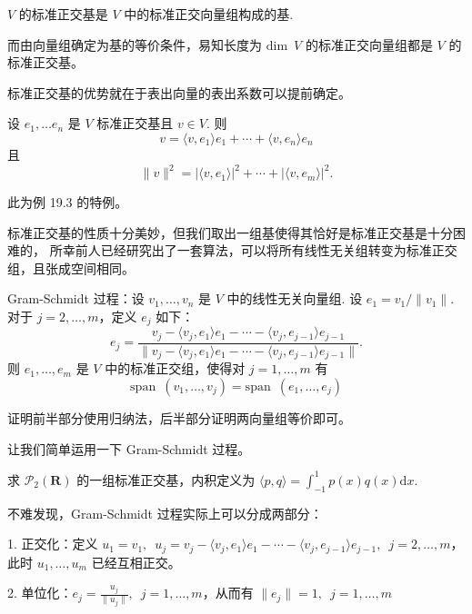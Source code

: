 \begin{definition}
    $ V $ 的标准正交基是 $ V $ 中的标准正交向量组构成的基.
\end{definition}

而由向量组确定为基的等价条件，易知长度为 $\mathrm{dim} \enspace V$ 的标准正交向量组都是
$ V $ 的标准正交基。    

标准正交基的优势就在于表出向量的表出系数可以提前确定。

\begin{theorem}
    设 $e_1, \ldots e_n$ 是 $ V $ 标准正交基且 $ v \in V$. 则
    \[ v = \langle v, e_1 \rangle e_1 + \cdots + \langle v, e_n \rangle e_n \]
    且
    \[ \lVert v \rVert^2 = \lvert \langle v, e_1\rangle \rvert^2 + \cdots + \lvert \langle v, e_m\rangle \rvert^2. \]
\end{theorem}

此为例 19.3 的特例。


标准正交基的性质十分美妙，但我们取出一组基使得其恰好是标准正交基是十分困难的，
所幸前人已经研究出了一套算法，可以将所有线性无关组转变为标准正交组，且张成空间相同。

\begin{theorem}
    Gram-Schmidt 过程：设 $v_1, \ldots ,v_n$ 是 $ V $ 中的线性无关向量组.
    设 $e_1 = v_1/ \lVert v_1 \rVert$. 对于 $ j = 2, \ldots , m$，定义 $ e_j $ 如下：
    \[ e_j = \frac{v_j - \langle v_j, e_1 \rangle e_1 - \cdots - \langle v_j, e_{j - 1} \rangle e_{j - 1} }{\lVert v_j - \langle v_j, e_1 \rangle e_1 - \cdots - \langle v_j, e_{j - 1} \rangle e_{j - 1} \rVert}.\]
    则 $e_1, \ldots , e_m $ 是 $ V $ 中的标准正交组，使得对 $ j = 1, \ldots , m $ 有
    \[ \mathrm{span} \enspace (v_1, \ldots, v_j) = \mathrm{span} \enspace (e_1, \ldots, e_j) \]
\end{theorem}

证明前半部分使用归纳法，后半部分证明两向量组等价即可。

让我们简单运用一下 Gram-Schmidt 过程。
\begin{example}
    求 $\mathcal{P}_2(\mathbf{R})$ 的一组标准正交基，内积定义为 $\langle p, q \rangle = \int_{-1}^1 p(x)q(x)\mathrm{d}x$. 
\end{example}

不难发现，Gram-Schmidt 过程实际上可以分成两部分：

1. 正交化：定义 $ u_1 = v_1 , \enspace u_j = v_j - \langle v_j, e_1 \rangle e_1 - \cdots - \langle v_j, e_{j - 1} \rangle e_{j - 1},
\enspace j = 2, \ldots , m$，此时 $u_1, \ldots , u_m$ 已经互相正交。

2. 单位化：$ e_j = \frac{u_j}{\lVert u_j \rVert} , \enspace j = 1, \ldots , m$，从而有 $\lVert e_j \rVert = 1, \enspace j = 1, \ldots , m$

